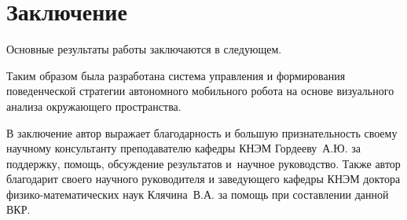 \chapter*{Заключение}                       %


Основные результаты работы заключаются в следующем.

Таким образом была разработана система управления и формирования поведенческой стратегии автономного мобильного робота на основе визуального анализа окружающего пространства.

В заключение автор выражает благодарность и большую признательность своему научному консультанту преподавателю кафедры КНЭМ Гордееву~А.\:Ю. за поддержку, помощь, обсуждение результатов и~научное руководство. Также автор благодарит своего научного руководителя и заведующего кафедры КНЭМ доктора физико-математических наук Клячина~В.\:А. за помощь при составлении данной ВКР.